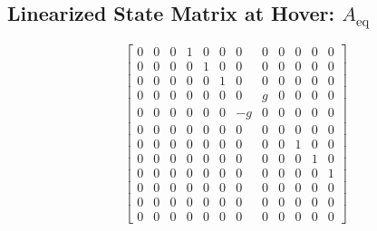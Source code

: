 \documentclass{article}
\begin{document}
\subsection*{Linearized State Matrix at Hover: $A_{\text{eq}}$}
\[
\left[\begin{matrix}0 & 0 & 0 & 1 & 0 & 0 & 0 & 0 & 0 & 0 & 0 & 0\\0 & 0 & 0 & 0 & 1 & 0 & 0 & 0 & 0 & 0 & 0 & 0\\0 & 0 & 0 & 0 & 0 & 1 & 0 & 0 & 0 & 0 & 0 & 0\\0 & 0 & 0 & 0 & 0 & 0 & 0 & g & 0 & 0 & 0 & 0\\0 & 0 & 0 & 0 & 0 & 0 & - g & 0 & 0 & 0 & 0 & 0\\0 & 0 & 0 & 0 & 0 & 0 & 0 & 0 & 0 & 0 & 0 & 0\\0 & 0 & 0 & 0 & 0 & 0 & 0 & 0 & 0 & 1 & 0 & 0\\0 & 0 & 0 & 0 & 0 & 0 & 0 & 0 & 0 & 0 & 1 & 0\\0 & 0 & 0 & 0 & 0 & 0 & 0 & 0 & 0 & 0 & 0 & 1\\0 & 0 & 0 & 0 & 0 & 0 & 0 & 0 & 0 & 0 & 0 & 0\\0 & 0 & 0 & 0 & 0 & 0 & 0 & 0 & 0 & 0 & 0 & 0\\0 & 0 & 0 & 0 & 0 & 0 & 0 & 0 & 0 & 0 & 0 & 0\end{matrix}\right]
\]
\end{document}
